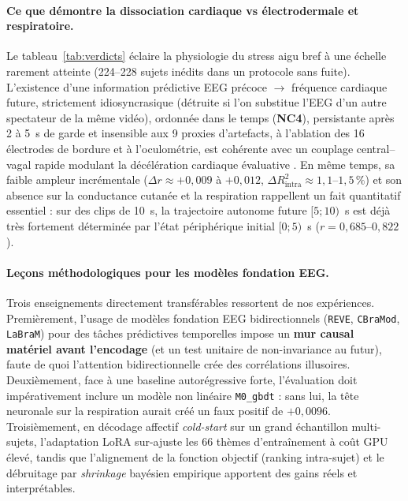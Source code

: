 \documentclass[10pt]{article}
\begin{document}
\paragraph{Ce que démontre la dissociation cardiaque vs électrodermale et respiratoire.}
Le tableau~\ref{tab:verdicts} éclaire la physiologie du stress aigu bref à une échelle rarement atteinte (224--228 sujets inédits dans un protocole sans fuite). L'existence d'une information prédictive EEG précoce $\to$ fréquence cardiaque future, strictement idiosyncrasique (détruite si l'on substitue l'EEG d'un autre spectateur de la même vidéo), ordonnée dans le temps (\textbf{NC4}), persistante après 2 à 5~s de garde et insensible aux 9 proxies d'artefacts, à l'ablation des 16 électrodes de bordure et à l'oculométrie, est cohérente avec un couplage central--vagal rapide modulant la décélération cardiaque évaluative \cite{thayer2009,parkblanke2019}. En même temps, sa faible ampleur incrémentale ($\Delta r \approx +0{,}009$ à $+0{,}012$, $\Delta R^2_{\text{intra}} \approx 1{,}1$--$1{,}5\,\%$) et son absence sur la conductance cutanée et la respiration rappellent un fait quantitatif essentiel : sur des clips de 10~s, la trajectoire autonome future $[5 ; 10)$~s est déjà très fortement déterminée par l'état périphérique initial $[0 ; 5)$~s ($r = 0{,}685$--$0{,}822$).

\paragraph{Leçons méthodologiques pour les modèles fondation EEG.}
Trois enseignements directement transférables ressortent de nos expériences. Premièrement, l'usage de modèles fondation EEG bidirectionnels (\texttt{REVE}, \texttt{CBraMod}, \texttt{LaBraM}) pour des tâches prédictives temporelles impose un \textbf{mur causal matériel avant l'encodage} (et un test unitaire de non-invariance au futur), faute de quoi l'attention bidirectionnelle crée des corrélations illusoires. Deuxièmement, face à une baseline autorégressive forte, l'évaluation doit impérativement inclure un modèle non linéaire \texttt{M0\_gbdt} : sans lui, la tête neuronale sur la respiration aurait créé un faux positif de $+0{,}0096$. Troisièmement, en décodage affectif \emph{cold-start} sur un grand échantillon multi-sujets, l'adaptation LoRA sur-ajuste les 66 thèmes d'entraînement à coût GPU élevé, tandis que l'alignement de la fonction objectif (ranking intra-sujet) et le débruitage par \emph{shrinkage} bayésien empirique apportent des gains réels et interprétables.
\end{document}

